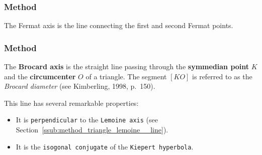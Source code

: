 \subsubsection{Method } %
\label{ssub:method_triangle_fermat__axis}

The Fermat axis is the  line connecting the first and second Fermat points.

\begin{minipage}{.5\textwidth}
    \begin{center}
    \end{center}
\end{minipage}
\begin{minipage}{.5\textwidth}
\begin{tkzexample}
\end{tkzexample}
\end{minipage}

\subsubsection{Method } %
\label{ssub:method_triangle_brocard__axis}

The \textbf{Brocard axis} is the straight line passing through the \textbf{symmedian point} $K$ and the \textbf{circumcenter} $O$ of a triangle. The segment $[KO]$ is referred to as the \emph{Brocard diameter} (see Kimberling, 1998, p.~150).

\medskip

This line has several remarkable properties:
\begin{itemize}
  \item It is \texttt{perpendicular} to the \texttt{Lemoine axis} (see Section~\ref{ssub:method_triangle_lemoine__line}).
  \item It is the \texttt{isogonal conjugate} of the \texttt{Kiepert hyperbola}.
\end{itemize}


